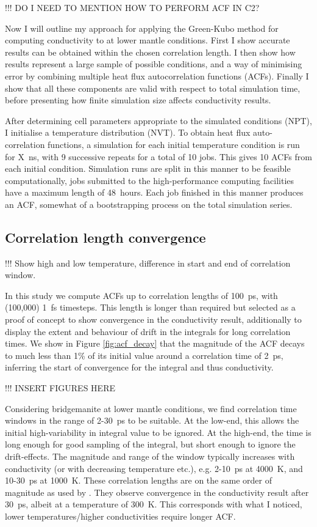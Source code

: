 !!! DO I NEED TO MENTION HOW TO PERFORM ACF IN C2?

Now I will outline my approach for applying the Green-Kubo method for computing conductivity to \bdgs at lower mantle conditions. First I show accurate results can be obtained within the chosen correlation length. I then show how results represent a large sample of possible conditions, and a way of minimising error by combining multiple heat flux autocorrelation functions (ACFs). Finally I show that all these components are valid with respect to total simulation time, before presenting how finite simulation size affects conductivity results.

After determining cell parameters appropriate to the simulated conditions (NPT), I initialise a temperature distribution (NVT). To obtain heat flux auto-correlation functions, a simulation for each initial temperature condition is run for X~ns, with 9 successive repeats for a total of 10 jobs. This gives 10 ACFs from each initial condition. Simulation runs are split in this manner to be feasible computationally, jobs submitted to the high-performance computing facilities have a maximum length of 48~hours. Each job finished in this manner produces an ACF, somewhat of a bootstrapping process on the total simulation series.

\subsection{\label{sec:3.GK.cor}Correlation length convergence}

!!! Show high and low temperature, difference in start and end of correlation window.

In this study we compute ACFs up to correlation lengths of 100~ps, with (100,000) 1~fs timesteps. This length is longer than required but selected as a proof of concept to show convergence in the conductivity result, additionally to display the extent and behaviour of drift in the integrals for long correlation times. We show in Figure \ref{fig:acf_decay} that the magnitude of the ACF decays to much less than 1\% of its initial value around a correlation time of 2~ps, inferring the start of convergence for the integral and thus conductivity.

!!! INSERT FIGURES HERE

Considering bridgemanite at lower mantle conditions, we find correlation time windows in the range of 2-30~ps to be suitable. At the low-end, this allows the initial high-variability in integral value to be ignored. At the high-end, the time is long enough for good sampling of the integral, but short enough to ignore the drift-effects. The magnitude and range of the window typically increases with conductivity (or with decreasing temperature etc.), e.g. 2-10~ps at 4000~K, and 10-30~ps at 1000~K. These correlation lengths are on the same order of magnitude as used by \citet{Haigis2012}. They observe convergence in the conductivity result after 30~ps, albeit at a temperature of 300~K. This corresponds with what I noticed, lower temperatures/higher conductivities require longer ACF.

